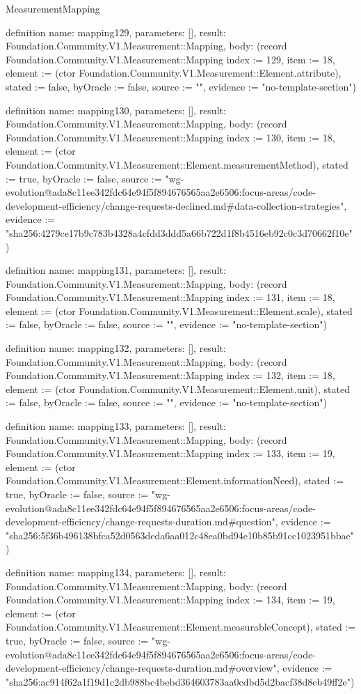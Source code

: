 \begin{lexlean}{MeasurementMapping}
\begin{semanticmodule}
definition{
  name: mapping129,
  parameters: [],
  result: Foundation.Community.V1.Measurement::Mapping,
  body: (record Foundation.Community.V1.Measurement::Mapping {index := 129, item := 18, element := (ctor Foundation.Community.V1.Measurement::Element.attribute), stated := false, byOracle := false, source := "", evidence := "no-template-section"})
}

definition{
  name: mapping130,
  parameters: [],
  result: Foundation.Community.V1.Measurement::Mapping,
  body: (record Foundation.Community.V1.Measurement::Mapping {index := 130, item := 18, element := (ctor Foundation.Community.V1.Measurement::Element.measurementMethod), stated := true, byOracle := false, source := "wg-evolution@ada8c11ee342fdc64e94f5f894676565aa2e6506:focus-areas/code-development-efficiency/change-requests-declined.md#data-collection-strategies", evidence := "sha256:4279ce17b9c783b4328a4cfdd3ddd5a66b722d1f8b4516eb92c0c3d70662f10e"})
}

definition{
  name: mapping131,
  parameters: [],
  result: Foundation.Community.V1.Measurement::Mapping,
  body: (record Foundation.Community.V1.Measurement::Mapping {index := 131, item := 18, element := (ctor Foundation.Community.V1.Measurement::Element.scale), stated := false, byOracle := false, source := "", evidence := "no-template-section"})
}

definition{
  name: mapping132,
  parameters: [],
  result: Foundation.Community.V1.Measurement::Mapping,
  body: (record Foundation.Community.V1.Measurement::Mapping {index := 132, item := 18, element := (ctor Foundation.Community.V1.Measurement::Element.unit), stated := false, byOracle := false, source := "", evidence := "no-template-section"})
}

definition{
  name: mapping133,
  parameters: [],
  result: Foundation.Community.V1.Measurement::Mapping,
  body: (record Foundation.Community.V1.Measurement::Mapping {index := 133, item := 19, element := (ctor Foundation.Community.V1.Measurement::Element.informationNeed), stated := true, byOracle := false, source := "wg-evolution@ada8c11ee342fdc64e94f5f894676565aa2e6506:focus-areas/code-development-efficiency/change-requests-duration.md#question", evidence := "sha256:5f36b496138bfca52d0563deda6aa012c48ea0bd94e10b85b91cc1023951bbae"})
}

definition{
  name: mapping134,
  parameters: [],
  result: Foundation.Community.V1.Measurement::Mapping,
  body: (record Foundation.Community.V1.Measurement::Mapping {index := 134, item := 19, element := (ctor Foundation.Community.V1.Measurement::Element.measurableConcept), stated := true, byOracle := false, source := "wg-evolution@ada8c11ee342fdc64e94f5f894676565aa2e6506:focus-areas/code-development-efficiency/change-requests-duration.md#overview", evidence := "sha256:ac914f62a1f19d1c2db988bc4bebd364603783aa0cdbd5d2bacf38d8eb49ff2e"})
}


\end{semanticmodule}
\end{lexlean}
